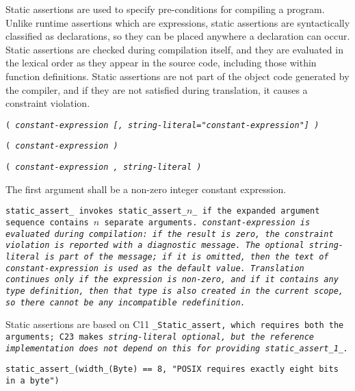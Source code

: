 Static assertions are used to specify pre-conditions for compiling a program.
Unlike runtime assertions which are expressions,
static assertions are syntactically classified as declarations,
so they can be placed anywhere a declaration can occur.
Static assertions are checked during compilation itself,
and they are evaluated in the lexical order as they appear in the source code,
including those within function definitions.
Static assertions are not part of the object code generated by the compiler,
and if they are not satisfied during translation,
it causes a constraint violation.


\s\s\s\tt{(}   \it{constant-expression}
[\tt{,} \it{string-literal}\tt{="}\it{constant-expression}\tt{"}] \tt{)}

\s\tt{(} \it{constant-expression} \tt{)}

\s\tt{(} \it{constant-expression} \phantom{[}\tt{,}
\it{string-literal} \tt{)}


The first argument shall be a non-zero integer constant expression.


\tt{static_assert_} invokes \tt{static_assert_}$n$\_ if the
expanded argument sequence contains $n$ separate arguments.
\it{constant-expression} is evaluated during compilation: if the result is zero,
the constraint violation is reported with a diagnostic message.
The optional \it{string-literal} is part of the message; if it is omitted,
then the text of \it{constant-expression} is used as the default value.
Translation continues only if the expression is non-zero,
and if it contains any type definition,
then that type is also created in the current scope,
so there cannot be any incompatible redefinition.

\note Static assertions are based on C11 \tt{_Static_assert}, which requires
both the arguments; C23 makes \it{string-literal} optional, but the reference
implementation does not depend on this for providing \tt{static_assert_1_}.

\example \tt{static_assert_(width_(Byte) == 8,
"POSIX requires exactly eight bits in a byte")}
